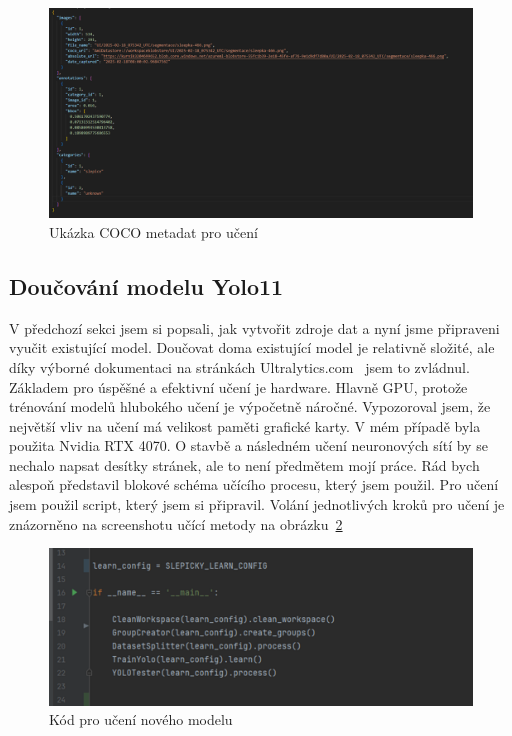 \begin{figure}[htbp]
    \centering
    \includegraphics[width=1.0\textwidth]{img/coco_format}
    \caption{Ukázka COCO metadat pro učení}
    \label{fig:coco_format}
\end{figure}

\subsection*{Doučování modelu Yolo11}\label{subsec:doucovani-modelu-yolov11-o-novou-tridu}
V předchozí sekci jsem si popsali, jak vytvořit zdroje dat a nyní jsme připraveni vyučit existující model.
Doučovat doma existující model je relativně složité, ale díky výborné dokumentaci na stránkách Ultralytics.com~\cite{ultralytics_yolo} jsem to zvládnul.
Základem pro úspěšné a efektivní učení je hardware.
Hlavně GPU, protože trénování modelů hlubokého učení je výpočetně náročné.
Vypozoroval jsem, že největší vliv na učení má velikost paměti grafické karty.
V mém případě byla použita Nvidia RTX 4070.
O stavbě a následném učení neuronových sítí by se nechalo napsat desítky stránek, ale to není předmětem mojí práce.
Rád bych alespoň představil blokové schéma učícího procesu, který jsem použil.\newline
\newline
Pro učení jsem použil script, který jsem si připravil.
Volání jednotlivých kroků pro učení je znázorněno na screenshotu učící metody na obrázku~\ref{fig:learn_script}

\begin{figure}[htbp]
    \centering
    \includegraphics[width=1.0\textwidth]{img/learn_script}
    \caption{Kód pro učení nového modelu}
    \label{fig:learn_script}
\end{figure}

